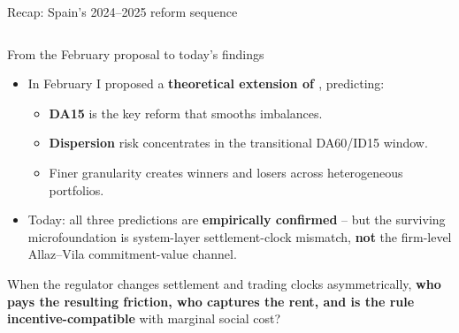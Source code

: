 \documentclass[aspectratio=169,10pt]{beamer}
\begin{document}
\begin{frame}{Recap: Spain's 2024--2025 reform sequence}
\begin{columns}[T]
\vspace{1.6em}
\centering
{}
\end{columns}
\end{frame}

\begin{frame}{From the February proposal to today's findings}
\begin{itemize}
  \item In February I proposed a \textbf{theoretical extension of \citet{ItoReguant}}, predicting:
  \begin{itemize}
    \item \textbf{DA15} is the key reform that smooths imbalances.
    \item \textbf{Dispersion} risk concentrates in the transitional DA60/ID15 window.
    \item Finer granularity creates winners and losers across heterogeneous portfolios.
  \end{itemize}
  \item Today: all three predictions are \textbf{empirically confirmed} -- but the surviving microfoundation is system-layer settlement-clock mismatch, \textbf{not} the firm-level Allaz--Vila commitment-value channel.
\end{itemize}

\vspace{0.4em}
\begin{tcolorbox}[
  title=Today's IO question,
  colback=main!4, colframe=main, fonttitle=\bfseries
]
When the regulator changes settlement and trading clocks asymmetrically, \textbf{who pays the resulting friction, who captures the rent, and is the rule incentive-compatible} with marginal social cost?
\end{tcolorbox}
\end{frame}
\end{document}
